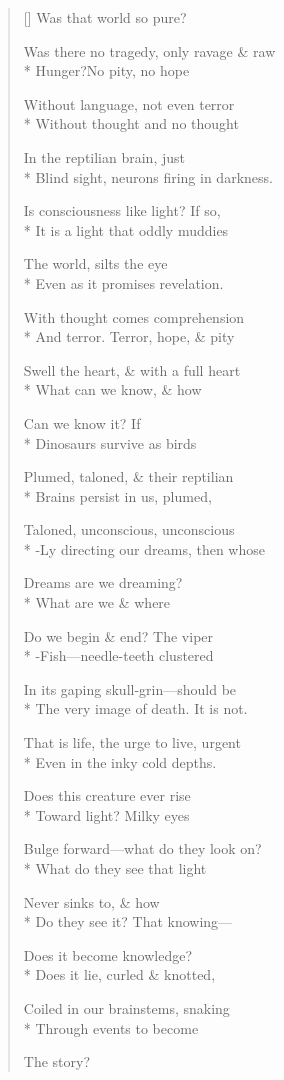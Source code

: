 \label{ch:the_age_of_dinosaurs}
\settowidth{\versewidth}{Was there no tragedy, only ravage \& raw}
\begin{verse}[\versewidth]
Was that world so pure?

Was there no tragedy, only ravage \& raw\\*
Hunger?\quad No pity, no hope

Without language, not even terror\\*
Without thought   and no thought

In the reptilian brain, just\\*
Blind sight, neurons firing in darkness.

Is consciousness like light?   If so,\\*
It is a light that oddly muddies

The world, silts the eye\\*
Even as it promises revelation.

With thought comes comprehension\\*
And terror. Terror, hope, \& pity

Swell the heart, \& with a full heart\\*
What can we know, \& how

Can we know it? \qquad If\\*
Dinosaurs survive as birds

Plumed, taloned, \& their reptilian\\*
Brains persist in us, plumed,

Taloned, unconscious, unconscious\\*
-Ly directing our dreams, then whose

Dreams are we dreaming?\\*
What are we \& where

Do we begin \& end?   The viper\\*
-Fish---needle-teeth clustered

In its gaping skull-grin---should be\\*
The very image of death. It is not.

That is life, the urge to live, urgent\\*
Even in the inky cold depths.

Does this creature ever rise\\*
Toward light? Milky eyes

Bulge forward---what do they look on?\\*
What do they see that light

Never sinks to,   \& how\\*
Do they see it?   That knowing---

Does it become knowledge?\\*
Does it lie, curled \& knotted,

Coiled in our brainstems, snaking\\*
Through events to become

The story?
\end{verse}
